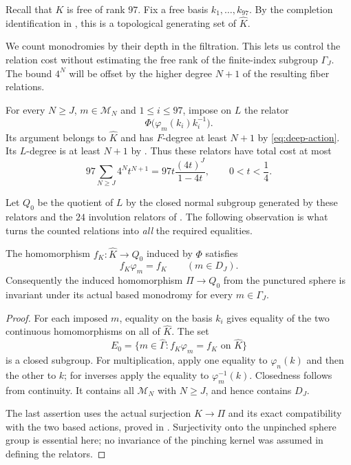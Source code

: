 Recall that $K$ is free of rank $97$. Fix a free basis $k_1,\ldots,k_{97}$. By the completion identification in , this is a topological generating set of $\widehat K$.

We count monodromies by their depth in the filtration. This lets us
control the relation cost without estimating the free rank of the
finite-index subgroup $\Gamma_J$. The
bound $4^N$ will be offset by the higher degree $N+1$ of the resulting
fiber relations.

For every $N\ge J$, $m\in\mathcal M_N$ and $1\le i\le97$, impose on $L$ the relator
\begin{equation}\label{eq:monodromy-relators}
 \Phi\bigl(\varphi_m(k_i)k_i^{-1}\bigr).
\end{equation}
Its argument belongs to $\widehat K$ and has $F$-degree at least $N+1$ by \eqref{eq:deep-action}. Its $L$-degree is at least $N+1$ by . Thus these relators have total cost at most
\begin{equation}\label{eq:monodromy-cost}
 97\sum_{N\ge J}4^N t^{N+1}
 =97t\frac{(4t)^J}{1-4t},\qquad 0<t<\frac14.
\end{equation}

Let $Q_0$ be the quotient of $L$ by the closed normal subgroup generated by these relators and the $24$ involution relators of . The following observation is what turns the counted relations into \emph{all} the required equalities.

\begin{lemma}\label{lem:deep-invariance}
The homomorphism $f_K:\widehat K\to Q_0$ induced by $\Phi$ satisfies
\[
 f_K\varphi_m=f_K\qquad(m\in D_J).
\]
Consequently the induced homomorphism $\Pi\to Q_0$ from the punctured sphere is invariant under its actual based monodromy for every $m\in\Gamma_J$.
\end{lemma}

\begin{proof}
For each imposed $m$, equality on the basis $k_i$ gives equality of the two continuous homomorphisms on all of $\widehat K$. The set
\[
 E_0=\{m\in\widehat\Gamma:f_K\varphi_m=f_K
                     \text{ on }\widehat K\}
\]
is a closed subgroup. For multiplication, apply one equality to $\varphi_n(k)$ and then the other to $k$; for inverses apply the equality to $\varphi_m^{-1}(k)$. Closedness follows from continuity. It contains all $\mathcal M_N$ with $N\ge J$, and hence contains $D_J$.

The last assertion uses the actual surjection $K\to\Pi$ and its exact compatibility with the two based actions, proved in . Surjectivity onto the unpinched sphere group is essential here; no invariance of the pinching kernel was assumed in defining the relators.
\end{proof}

